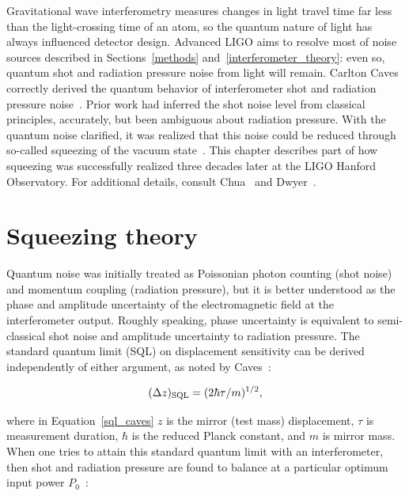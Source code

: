 


Gravitational wave interferometry measures changes in light travel time far less than the light-crossing time of an atom, so the quantum nature of light has always influenced detector design.
Advanced LIGO aims to resolve most of noise sources described in Sections~\ref{methods} and~\ref{interferometer_theory}: even so, quantum shot and radiation pressure noise from light will remain.
Carlton Caves correctly derived the quantum behavior of interferometer shot and radiation pressure noise~\cite{Caves1980}.
Prior work had inferred the shot noise level from classical principles, accurately, but been ambiguous about radiation pressure.
With the quantum noise clarified, it was realized that this noise could be reduced through so-called squeezing of the vacuum state~\cite{Caves1981}.
This chapter describes part of how squeezing was successfully realized three decades later at the LIGO Hanford Observatory.
For additional details, consult Chua~\cite{ChuaThesis} and Dwyer~\cite{DwyerThesis}.

    \section{Squeezing theory}
    \label{squeezing_theory}

Quantum noise was initially treated as Poissonian photon counting (shot noise) and momentum coupling (radiation pressure), but it is better understood as the phase and amplitude uncertainty of the electromagnetic field at the interferometer output. 
Roughly speaking, phase uncertainty is equivalent to semi-classical shot noise and amplitude uncertainty to radiation pressure.
The standard quantum limit (SQL) on displacement sensitivity can be derived independently of either argument, as noted by Caves~\cite{Caves1981}:

\begin{equation}
(\Delta z)_{\textup{SQL}} = (2 \hbar \tau / m)^{1/2},
\label{sql_caves}
\end{equation}

\noindent where in Equation~\ref{sql_caves} $z$ is the mirror (test mass) displacement, $\tau$ is measurement duration, $\hbar$ is the reduced Planck constant, and $m$ is mirror mass.
When one tries to attain this standard quantum limit with an interferometer, then shot and radiation pressure are found to balance at a particular optimum input power $P_0$~\cite{Caves1981}:

